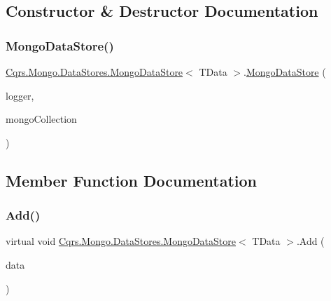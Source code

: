 \subsection{Constructor \& Destructor Documentation}
\mbox{\label{classCqrs_1_1Mongo_1_1DataStores_1_1MongoDataStore_a39f738d53074a548e6932bacdc4a4e3a_a39f738d53074a548e6932bacdc4a4e3a}} 
\subsubsection{\texorpdfstring{Mongo\+Data\+Store()}{MongoDataStore()}}
{\footnotesize\ttfamily \hyperlink{classCqrs_1_1Mongo_1_1DataStores_1_1MongoDataStore}{Cqrs.\+Mongo.\+Data\+Stores.\+Mongo\+Data\+Store}$<$ T\+Data $>$.\hyperlink{classCqrs_1_1Mongo_1_1DataStores_1_1MongoDataStore}{Mongo\+Data\+Store} (\begin{DoxyParamCaption}\item[{I\+Logger}]{logger,  }\item[{\hyperlink{classCqrs_1_1Mongo_1_1DataStores_1_1MongoDataStore_aa183a8ce44ec16d755f1e4fbe5ec4b10_aa183a8ce44ec16d755f1e4fbe5ec4b10}{Mongo\+Collection}$<$ T\+Data $>$}]{mongo\+Collection }\end{DoxyParamCaption})}



\subsection{Member Function Documentation}
\mbox{\label{classCqrs_1_1Mongo_1_1DataStores_1_1MongoDataStore_a27bcfb40fe8203e09d320b2aa19fff3a_a27bcfb40fe8203e09d320b2aa19fff3a}} 
\subsubsection{\texorpdfstring{Add()}{Add()}\hspace{0.1cm}{\footnotesize\ttfamily [1/2]}}
{\footnotesize\ttfamily virtual void \hyperlink{classCqrs_1_1Mongo_1_1DataStores_1_1MongoDataStore}{Cqrs.\+Mongo.\+Data\+Stores.\+Mongo\+Data\+Store}$<$ T\+Data $>$.Add (\begin{DoxyParamCaption}\item[{T\+Data}]{data }\end{DoxyParamCaption})\hspace{0.3cm}{\ttfamily [virtual]}}



